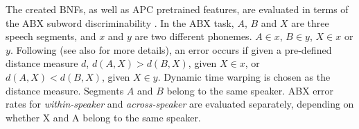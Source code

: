 \documentclass[a4paper]{article}
\newcommand{\quotes}[1]{``#1''}
\begin{document}
The created BNFs, as well as APC pretrained features, are evaluated in terms of the ABX subword discriminability \cite{dunbar2017zero}.
In the ABX task, $A$, $B$ and $X$ are three speech segments, and $x$ and $y$ are two different phonemes. $A \in x$, $B \in y$, $X \in x$ or $y$. Following \cite{dunbar2017zero} (see also for more details), an error occurs if given a pre-defined distance measure $d$, $d(A,X) > d(B,X)$, given $X \in x$, 
or $d(A,X) < d(B,X)$, given $X \in y$.
Dynamic time warping is chosen as the distance measure. Segments $A$ and $B$   belong to the same speaker. ABX error rates for \textit{within-speaker} and \textit{across-speaker} are evaluated separately, depending
on whether X and A belong to the same speaker.
\end{document}
